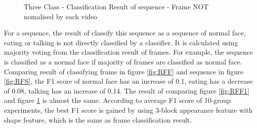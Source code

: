 \begin{figure}[ht]
\begin{minipage}{.5\textwidth}
  \caption{Three Class - Classification Result of sequence - Frame NOT nomalised by each video}
  \label{fig:RFS1}
\end{minipage}
\end{figure}
\newline
For a sequence, the result of classify this sequence as a sequence of normal face, eating or talking is not directly classified by a classifier. It is calculated using majority voting from the classification result of frames. For example, the sequence is classified as a normal face if majority of frames are classified as normal face. Comparing result of classifying frame in figure \ref{fig:RFF} and sequence in figure \ref{fig:RFS}, the F1 score of normal face has an increase of 0.1, eating has a decrease of 0.08, talking has an increase of 0.14. The result of comparing figure \ref{fig:RFF1} and figure \ref{fig:RFS1} is almost the same. According to average F1 score of 10-group experiments, the best F1 score is gained by using 3-block appearance feature with shape feature, which is the same as frame classification result.

